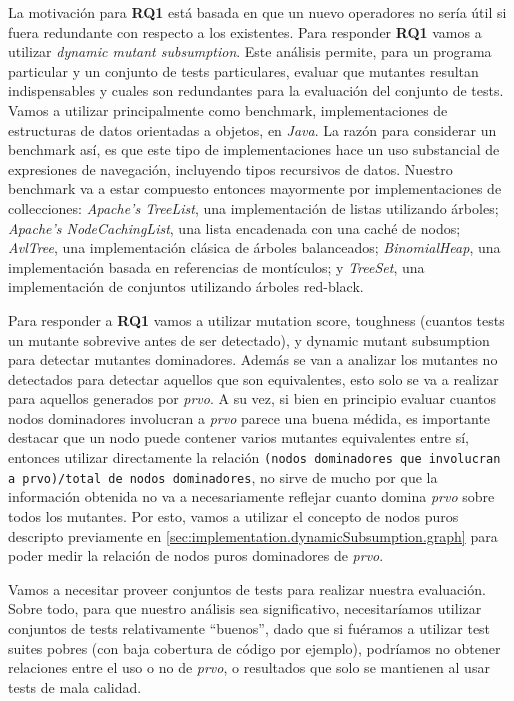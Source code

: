 La motivaci\'on para \textbf{RQ1} est\'a basada en que un nuevo operadores no ser\'ia \'util si fuera redundante con respecto a los existentes. Para responder \textbf{RQ1} vamos a utilizar \emph{dynamic mutant subsumption}. Este an\'alisis permite, para un programa particular y un conjunto de tests particulares, evaluar que mutantes resultan indispensables y cuales son redundantes para la evaluaci\'on del conjunto de tests. Vamos a utilizar principalmente como benchmark, implementaciones de estructuras de datos orientadas a objetos, en \emph{Java}. La raz\'on para considerar un benchmark as\'i, es que este tipo de implementaciones hace un uso substancial de expresiones de navegaci\'on, incluyendo tipos recursivos de datos. Nuestro benchmark va a estar compuesto entonces mayormente por implementaciones de collecciones:  \emph{Apache's TreeList}, una implementaci\'on de listas utilizando \'arboles; \emph{Apache's NodeCachingList}, una lista encadenada con una cach\'e de nodos; \emph{AvlTree}, una implementaci\'on cl\'asica de \'arboles balanceados; \emph{BinomialHeap}, una implementaci\'on basada en referencias de mont\'iculos; y \emph{TreeSet}, una implementaci\'on de conjuntos utilizando \'arboles red-black. %

Para responder a \textbf{RQ1} vamos a utilizar mutation score, toughness (cuantos tests un mutante sobrevive antes de ser detectado), y dynamic mutant subsumption para detectar mutantes dominadores. Adem\'as se van a analizar los mutantes no detectados para detectar aquellos que son equivalentes, esto solo se va a realizar para aquellos generados por \emph{prvo}. A su vez, si bien en principio evaluar cuantos nodos dominadores involucran a \emph{prvo} parece una buena m\'edida, es importante destacar que un nodo puede contener varios mutantes equivalentes entre s\'i, entonces utilizar directamente la relaci\'on \texttt{(nodos dominadores que involucran a prvo)/total de nodos dominadores}, no sirve de mucho por que la informaci\'on obtenida no va a necesariamente reflejar cuanto domina \emph{prvo} sobre todos los mutantes. Por esto, vamos a utilizar el concepto de nodos puros descripto previamente en \ref{sec:implementation.dynamicSubsumption.graph} para poder medir la relaci\'on de nodos puros dominadores de \emph{prvo}.

Vamos a necesitar proveer conjuntos de tests para realizar nuestra evaluaci\'on. Sobre todo, para que nuestro an\'alisis sea significativo, necesitar\'iamos utilizar conjuntos de tests relativamente ``buenos'', dado que si fu\'eramos a utilizar test suites pobres (con baja cobertura de c\'odigo por ejemplo), podr\'iamos no obtener relaciones entre el uso o no de \emph{prvo}, o resultados que solo se mantienen al usar tests de mala calidad.

